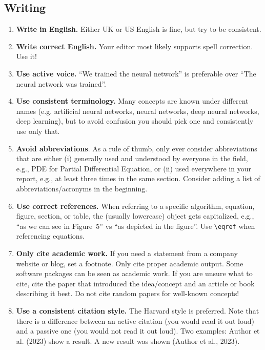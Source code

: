 \documentclass[11pt]{article}
\begin{document}
\subsection*{Writing}
\begin{enumerate}
    \item \textbf{Write in English.} Either UK or US English is fine, but try to be consistent.
    
    \item \textbf{Write correct English.} Your editor most likely supports spell correction. Use it!
    
    \item \textbf{Use active voice.} ``We trained the neural network'' is preferable over ``The neural network was trained''.  
   
    \item \textbf{Use consistent terminology.} Many concepts are known under different names (e.g. artificial neural networks, neural networks, deep neural networks, deep learning), but to avoid confusion you should pick one and consistently use only that. 
    
    \item \textbf{Avoid abbreviations}. As a rule of thumb, only ever consider abbreviations that are either (i) generally used and understood by everyone in the field, e.g., PDE for Partial Differential Equation, or (ii) used everywhere in your report, e.g., at least three times in the same section. Consider adding a list of abbreviations/acronyms in the beginning.

    \item \textbf{Use correct references.} When referring to a specific algorithm, equation, figure, section, or table, the (usually lowercase) object gets capitalized, e.g., ``as we can see in Figure~5'' vs ``as depicted in the figure''. Use \texttt{\textbackslash eqref} when referencing equations. 

    \item \textbf{Only cite academic work.} If you need a statement from a company website or blog, set a footnote. Only cite proper academic output. Some software packages can be seen as academic work. If you are unsure what to cite, cite the paper that introduced the idea/concept and an article or book describing it best. Do not cite random papers for well-known concepts!
    
    \item \textbf{Use a consistent citation style.} The Harvard style is preferred. Note that there is a difference between an active citation (you would read it out loud) and a passive one (you would not read it out loud). Two examples: Author et al. (2023) show a result. A new result was shown (Author et al., 2023).

\end{enumerate}
\end{document}
